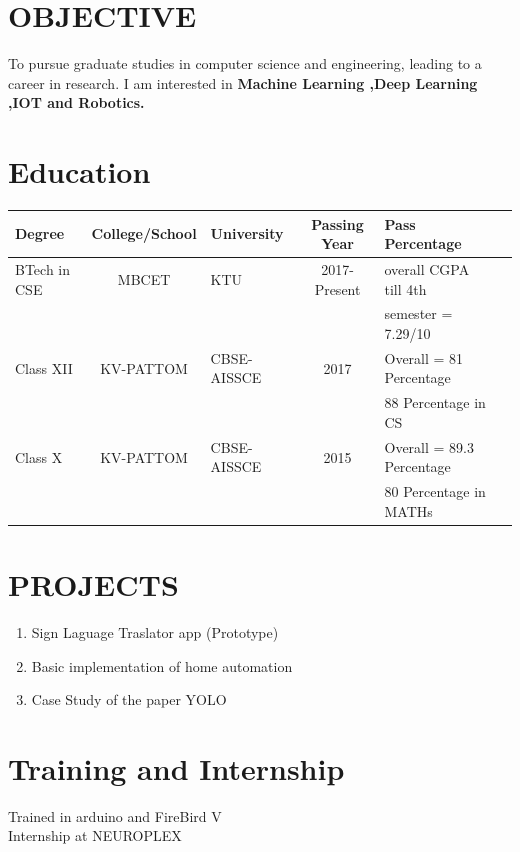 \documentclass[margin,line]{res}
\begin{document}
\begin{resume}
	\section{\sc OBJECTIVE}

To pursue graduate studies in computer science and engineering, leading to a career in research. I am interested in \bf Machine Learning ,Deep Learning ,IOT and Robotics. 

\vspace{.1in}
\section{\sc Education}
\begin{tabular}{|l|c|l|c|l|c|}\hline
	\bf Degree&\bf College/School&\bf University&\bf Passing Year&\bf Pass Percentage \\ \hline
	BTech in CSE
	&MBCET & KTU & 2017-Present&overall CGPA till 4th\\ &&&&semester  = 7.29/10 \\ \hline
	Class XII
	&KV-PATTOM & CBSE-AISSCE  & 2017& Overall = 81 Percentage \\&&&&88 Percentage in CS 
	
	\\ \hline
	Class X
	&KV-PATTOM & CBSE-AISSCE  & 2015& Overall = 89.3 Percentage \\&&&&80 Percentage in MATHs 
	
	\\ \hline
\end{tabular}	
\section{\sc PROJECTS}

\begin{enumerate} %
	\item Sign Laguage Traslator app (Prototype) \\
	\item Basic implementation of home automation\\
	\item Case Study of the paper YOLO\\
	
\end{enumerate}

\section{\sc Training and Internship}
Trained in arduino and FireBird V\\
Internship at NEUROPLEX \\

\end{resume}
\end{document}
